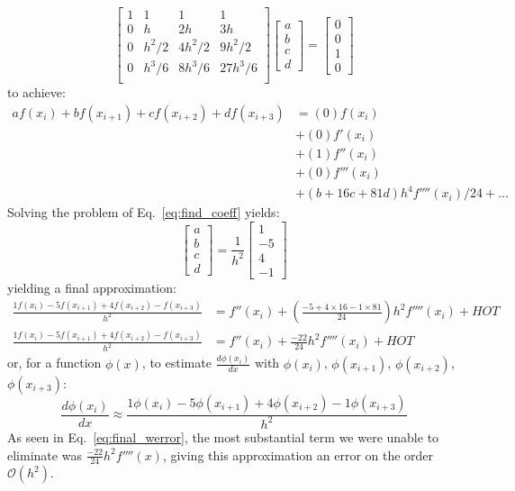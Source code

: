 \documentclass[12pt]{article}
\newcommand{\bigO}{\mathcal{O}}
\begin{document}
\begin{equation}\label{eq:find_coeff}
    \begin{bmatrix}
        1 & 1 & 1 & 1 \\
        0 & h & 2h & 3h \\
        0 & h^2/2 & 4h^2/2 & 9h^2/2 \\
        0 & h^3/6 & 8h^3/6 & 27h^3/6 \\
    \end{bmatrix}
    \begin{bmatrix}
        a\\b\\c\\d
    \end{bmatrix}
    =
    \begin{bmatrix}
        0\\0\\1\\0
    \end{bmatrix}
\end{equation}
to achieve:
\begin{align}
    af(x_i) + bf(x_{i+1})+cf(x_{i+2})+df(x_{i+3})
    &=(0)f(x_i)\\
    &+(0)f'(x_i)\nonumber\\
    &+(1)f''(x_i)\nonumber\\
    &+(0)f'''(x_i)\nonumber\\
    &+(b + 16c + 81d)h^4f''''(x_i)/24+...\nonumber
\end{align}
Solving the problem of Eq.~\ref{eq:find_coeff} yields:
\begin{equation}
    \begin{bmatrix}
        a\\b\\c\\d
    \end{bmatrix}
    =
    \frac{1}{h^2}
    \begin{bmatrix}
        1\\-5\\4\\-1
    \end{bmatrix}
\end{equation}
yielding a final approximation:
\begin{align}\label{eq:final_werror}
    \frac{1f(x_i) - 5f(x_{i+1})+4f(x_{i+2})-f(x_{i+3})}{h^2}&=f''(x_i)+(\frac{-5+4\times16-1\times81}{24})h^2f''''(x_i)+HOT\nonumber\\
    \frac{1f(x_i) - 5f(x_{i+1})+4f(x_{i+2})-f(x_{i+3})}{h^2}&=f''(x_i)+\frac{-22}{24}h^2f''''(x_i)+HOT
\end{align}
or, for a function $\phi(x)$, to estimate $\frac{d\phi(x_i)}{dx}$ with $\phi(x_i)$, $\phi(x_{i+1})$, $\phi(x_{i+2})$, $\phi(x_{i+3})$:
\begin{equation}
    \frac{d\phi(x_i)}{dx}\approx\frac{1\phi(x_i) - 5\phi(x_{i+1})+4\phi(x_{i+2})-1\phi(x_{i+3})}{h^2}
\end{equation}
As seen in Eq.~\ref{eq:final_werror}, the most substantial term we were unable to eliminate was $\frac{-22}{24}h^2f''''(x)$, giving this approximation an error on the order $\bigO(h^2)$.\\
\end{document}
